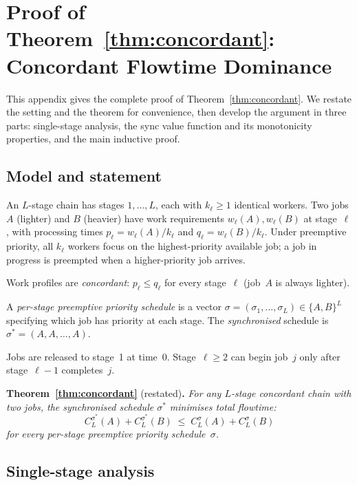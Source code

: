 \documentclass[11pt,titlepage]{article}
\begin{document}

\section{Proof of Theorem~\ref{thm:concordant}: Concordant Flowtime Dominance}
\label{app:concordant}

This appendix gives the complete proof of
Theorem~\ref{thm:concordant}. We restate the setting and
the theorem for convenience, then develop the argument in
three parts: single-stage analysis, the sync value function
and its monotonicity properties, and the main inductive proof.

\subsection{Model and statement}

An $L$-stage chain has stages $1, \ldots, L$, each with
$k_\ell \geq 1$ identical workers. Two jobs $A$ (lighter) and
$B$ (heavier) have work requirements $w_\ell(A), w_\ell(B)$ at
stage~$\ell$, with processing times
$p_\ell = w_\ell(A)/k_\ell$ and $q_\ell = w_\ell(B)/k_\ell$.
Under preemptive priority, all $k_\ell$ workers focus on the
highest-priority available job; a job in progress is preempted
when a higher-priority job arrives.

Work profiles are \emph{concordant}: $p_\ell \leq q_\ell$ for
every stage~$\ell$ (job~$A$ is always lighter).

A \emph{per-stage preemptive priority schedule} is a vector
$\sigma = (\sigma_1, \ldots, \sigma_L) \in \{A, B\}^L$
specifying which job has priority at each stage. The
\emph{synchronised} schedule is $\sigma^* = (A, A, \ldots, A)$.

Jobs are released to stage~1 at time~0. Stage~$\ell \geq 2$
can begin job~$j$ only after stage~$\ell{-}1$ completes~$j$.

\medskip
\noindent\textbf{Theorem~\ref{thm:concordant}} (restated)\textbf{.}
\emph{For any $L$-stage concordant chain with two jobs, the
synchronised schedule $\sigma^*$ minimises total flowtime:}
\[
  C_L^{\sigma^*}(A) + C_L^{\sigma^*}(B)
  \;\leq\;
  C_L^{\sigma}(A) + C_L^{\sigma}(B)
\]
\emph{for every per-stage preemptive priority
schedule~$\sigma$.}

\subsection{Single-stage analysis}
\end{document}
